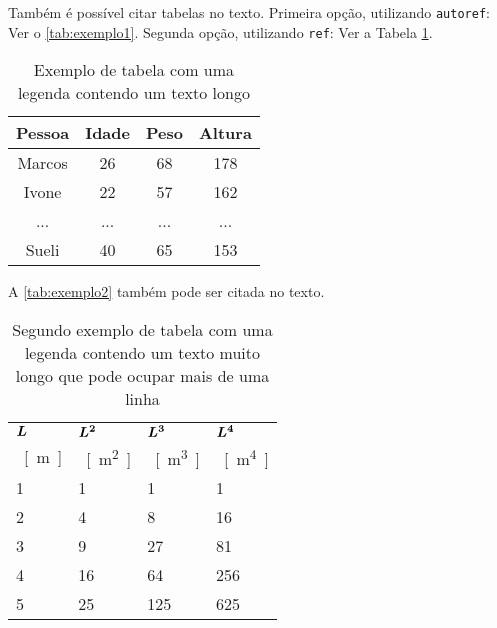 Também é possível citar tabelas no texto. Primeira opção, utilizando \texttt{autoref}: Ver o \autoref{tab:exemplo1}. Segunda opção, utilizando  \texttt{ref}: Ver a Tabela \ref{tab:exemplo1}.

\begin{table}[htb]
  \captionsetup{width=0.33\textwidth}
  \centering
  \caption{\label{tab:exemplo1}Exemplo de tabela com uma legenda contendo um texto longo}
  \begin{tabular}{cccc}
    \hline
    \textbf{Pessoa} & \textbf{Idade} & \textbf{Peso} & \textbf{Altura} \\ \hline
    Marcos          & 26             & 68            & 178             \\
    Ivone           & 22             & 57            & 162             \\
    ...             & ...            & ...           & ...             \\
    Sueli           & 40             & 65            & 153             \\ \hline
  \end{tabular}
  \fonte{}
\end{table}

A \autoref{tab:exemplo2} também pode ser citada no texto.

\begin{table}[htb]%
  \caption{Segundo exemplo de tabela com uma legenda contendo um texto muito longo que pode ocupar mais de uma linha}%
  \label{tab:exemplo2}%
  \begin{tabularx}{\textwidth}{@{\extracolsep{\fill}}llll}%
    \toprule
    $\boldsymbol{L}$ & $\boldsymbol{L^2}$ & $\boldsymbol{L^3}$ & $\boldsymbol{L^4}$ \\
    \SI{}{[m]} & \SI{}{[m^2]} & \SI{}{[m^3]} & \SI{}{[m^4]} \\ \midrule
    1          & 1            & 1            & 1            \\
    2          & 4            & 8            & 16           \\
    3          & 9            & 27           & 81           \\
    4          & 16           & 64           & 256          \\
    5          & 25           & 125          & 625          \\ \bottomrule
  \end{tabularx}
  \fonte{}%
\end{table}

